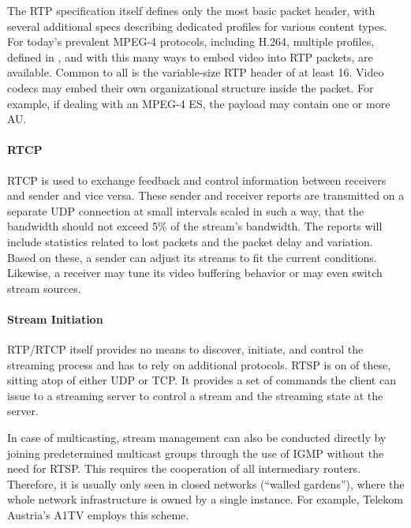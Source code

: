 The \gls{RTP} specification itself defines only the most basic packet header, with several additional specs describing dedicated profiles for various content types. For today's prevalent MPEG-4 protocols, including H.264, multiple profiles, defined in \cite{rfc3640,rfc6184,rfc6416} , and with this many ways to embed video into RTP packets, are available. Common to all is the variable-size \gls{RTP} header of at least \SI{16}{\byte}. Video codecs may embed their own organizational structure inside the packet. For example, if dealing with an MPEG-4 \gls{ES}, the payload may contain one or more \gls{AU}.


\paragraph{RTCP}

\gls{RTCP} is used to exchange feedback and control information between receivers and sender and vice versa. These sender and receiver reports are transmitted on a separate \gls{UDP} connection at small intervals scaled in such a way, that the bandwidth should not exceed 5\% of the stream's bandwidth. The reports will include statistics related to lost packets and the packet delay and variation. Based on these, a sender can adjust its streams to fit the current conditions. Likewise, a receiver may tune its video buffering behavior or may even switch stream sources.


\paragraph{Stream Initiation}

RTP/RTCP itself provides no means to discover, initiate, and control the streaming process and has to rely on additional protocols. \gls{RTSP} is on of these, sitting atop of either \gls{UDP} or \gls{TCP}. It provides a set of commands the client can issue to a streaming server to control a stream and the streaming state at the server.

In case of multicasting, stream management can also be conducted directly by joining predetermined multicast groups through the use of \gls{IGMP} \cite{rfc4604} without the need for \gls{RTSP}.
This requires the cooperation of all intermediary routers. Therefore, it is usually only seen in closed networks (``walled gardens''), where the whole network infrastructure is owned by a single instance. For example, Telekom Austria's A1TV employs this scheme. 


